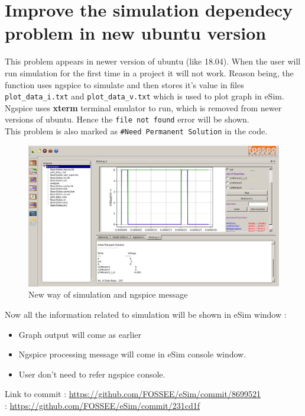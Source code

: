 \documentclass[12pt,a4paper]{report}
\begin{document}
\section{Improve the simulation dependecy problem in new ubuntu version}
This problem appears in newer version of ubuntu (like 18.04). When the user will run simulation for the first time in a project it will not work. Reason being, the function uses ngspice to simulate and then stores it's value in files \texttt{plot\_data\_i.txt} and \texttt{plot\_data\_v.txt} which is used to plot graph in eSim. Ngspice uses \textbf{xterm} terminal emulator to run, which is removed from newer versions of ubuntu. Hence the \texttt{file not found} error will be shown.
\\
This problem is also marked as \verb|#|\texttt{Need Permanent Solution} in the code.
\newpage
\begin{figure}[h]
	\centering
	\includegraphics[width=\textwidth]{esim3}
	\caption{New way of simulation and ngspice message}
\end{figure} 
Now all the information related to simulation will be shown in eSim window :
\begin{itemize}
	\itemsep0em
	\item Graph output will come as earlier
	\item Ngspice processing message will come in eSim console window.
	\item User don't need to refer ngspice console.
\end{itemize}
\vspace{3mm}
Link to commit : \url{https://github.com/FOSSEE/eSim/commit/8699521}
\\
\hspace*{28mm} : \url{https://github.com/FOSSEE/eSim/commit/231cd1f}
\\ 
\end{document}
